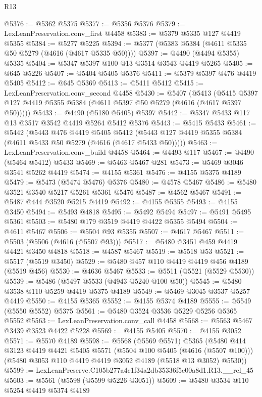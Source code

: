 \begin{lexlean}{R13}
\begin{coremodule}
@5376 := @5362 @5375
@5377 := @5356 @5376
@5379 := LexLeanPreservation.conv_first @4458
@5383 := @5379 @5335 @127 @4419 @5355
@5384 := @5277 @5225
@5394 := @5377 (@5383 @5384 (@4611 @5335 @50 @5279 (@4616 (@4617 @5335 @50))))
@5397 := @4490 (@4494 @5355) @5335
@5404 := @5347 @5397 @100 @13 @3514 @3543 @4419 @5265
@5405 := @645 @5226
@5407 := @5404 @5405 @5376
@5411 := @5379 @5397 @476 @4419 @5405
@5412 := @645 @5369
@5413 := @5411 @5412
@5415 := LexLeanPreservation.conv_second @4458
@5430 := @5407
    (@5413 (@5415 @5397 @127 @4419 @5355 @5384 (@4611 @5397 @50 @5279 (@4616 (@4617 @5397 @50)))))
@5433 := @4490 (@5180 @5405) @5397
@5442 := @5347 @5433 @117 @13 @3517 @3542 @4419 @5264 @5412 @5376
@5443 := @5415 @5433
@5461 := @5442
    (@5443
      @476
      @4419
      @5405
      @5412
      (@5443 @127 @4419 @5355 @5384 (@4611 @5433 @50 @5279 (@4616 (@4617 @5433 @50)))))
@5463 := LexLeanPreservation.conv_build @4458
@5464 := @4493 @117
@5467 := @4490 (@5464 @5412) @5433
@5469 := @5463 @5467 @281
@5473 := @5469 @3046 @3541 @5262 @4419
@5474 := @4155 @5361
@5476 := @4155 @5375 @4189
@5479 := @5473 (@5474 @5476) @5376
@5480 := @4578 @5467
@5486 := @5480 @3521 @3540 @5217 @5261 @5361 @5476
@5487 := @4562 @5467
@5491 := @5487 @444 @3520 @5215 @4419
@5492 := @4155 @5355
@5493 := @4155 @3450
@5494 := @5493 @4818
@5495 := @5492 @5494
@5497 := @5491 @5495 @5361
@5503 := @5480 @179 @3519 @4419 @4422 @5355 @5494
@5504 := @4611 @5467
@5506 := @5504 @93 @5355
@5507 := @4617 @5467
@5511 := @5503 (@5506 (@4616 (@5507 @93)))
@5517 := @5480 @3451 @459 @4419 @4421 @3450 @4818
@5518 := @4587 @5467
@5519 := @5518 @53
@5521 := @5517 (@5519 @3450)
@5529 := @5480 @457 @110 @4419 @4419 @456 @4189 (@5519 @456)
@5530 := @4636 @5467
@5533 := @5511 (@5521 (@5529 @5530))
@5539 := @5486 (@5497 @5533 (@4943 @5240 @100 @50))
@5545 := @5480 @3538 @110 @5259 @4419 @5375 @4189
@5549 := @5469 @3045 @3537 @5257 @4419
@5550 := @4155 @5365
@5552 := @4155 @5374 @4189
@5555 := @5549 (@5550 @5552) @5375
@5561 := @5480 @3524 @3536 @5229 @5256 @5365 @5552
@5563 := LexLeanPreservation.conv_call @4458
@5568 := @5563 @5467 @3439 @3523 @4422 @5228
@5569 := @4155 @5405
@5570 := @4155 @3052
@5571 := @5570 @4189
@5598 := @5568
    (@5569 @5571)
    @5365
    (@5480
      @414
      @3123
      @4419
      @4421
      @5405
      @5571
      (@5504 @100 @5405 (@4616 (@5507 @100)))
      (@5480 @3053 @110 @4419 @4419 @3052 @4189 (@5518 @13 @3052) @5530))
@5599 := LexLeanPreserve.C105b277a4c1f34a2db35336f5e00a8d1.R13.__rel_45
@5603 := @5561 (@5598 (@5599 @5226 @3051))
@5609 := @5480 @3534 @110 @5254 @4419 @5374 @4189

\end{coremodule}
\end{lexlean}
